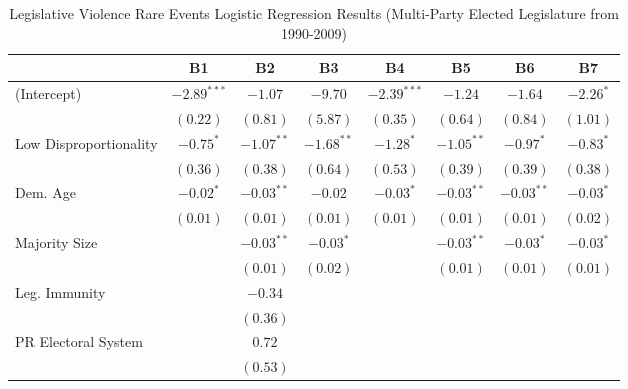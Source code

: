 \documentclass[a4paper]{article}\usepackage[]{graphicx}\usepackage[]{color}
\begin{document}
\begin{table}
\caption{Legislative Violence Rare Events Logistic Regression Results (Multi-Party Elected Legislature from 1990-2009)}
\label{outputTable.1990}
\begin{center}

\begin{tabular}{l c c c c c c c }
\hline
                        & B1 & B2 & B3 & B4 & B5 & B6 & B7 \\
\hline
(Intercept)             & $-2.89^{***}$ & $-1.07$      & $-9.70$      & $-2.39^{***}$ & $-1.24$      & $-1.64$      & $-2.26^{*}$ \\
                        & $(0.22)$      & $(0.81)$     & $(5.87)$     & $(0.35)$      & $(0.64)$     & $(0.84)$     & $(1.01)$    \\
Low Disproportionality  & $-0.75^{*}$   & $-1.07^{**}$ & $-1.68^{**}$ & $-1.28^{*}$   & $-1.05^{**}$ & $-0.97^{*}$  & $-0.83^{*}$ \\
                        & $(0.36)$      & $(0.38)$     & $(0.64)$     & $(0.53)$      & $(0.39)$     & $(0.39)$     & $(0.38)$    \\
Dem. Age                & $-0.02^{*}$   & $-0.03^{**}$ & $-0.02$      & $-0.03^{*}$   & $-0.03^{**}$ & $-0.03^{**}$ & $-0.03^{*}$ \\
                        & $(0.01)$      & $(0.01)$     & $(0.01)$     & $(0.01)$      & $(0.01)$     & $(0.01)$     & $(0.02)$    \\
Majority Size           &               & $-0.03^{**}$ & $-0.03^{*}$  &               & $-0.03^{**}$ & $-0.03^{*}$  & $-0.03^{*}$ \\
                        &               & $(0.01)$     & $(0.02)$     &               & $(0.01)$     & $(0.01)$     & $(0.01)$    \\
Leg. Immunity           &               & $-0.34$      &              &               &              &              &             \\
                        &               & $(0.36)$     &              &               &              &              &             \\
PR Electoral System     &               & $0.72$       &              &               &              &              &             \\
                        &               & $(0.53)$     &              &               &              &              &             \\

\end{tabular}
\end{center}
\end{table}
\end{document}
